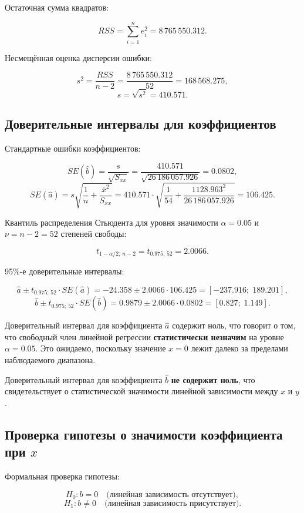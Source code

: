 Остаточная сумма квадратов:

\[
RSS = \sum_{i=1}^{n} e_i^2 = 8\,765\,550.312.
\]

Несмещённая оценка дисперсии ошибки:

\[
s^2 = \frac{RSS}{n-2} = \frac{8\,765\,550.312}{52} = 168\,568.275,
\]
\[
s = \sqrt{s^2} = 410.571.
\]

\subsection{Доверительные интервалы для коэффициентов}

Стандартные ошибки коэффициентов:

\[
SE(\hat{b}) = \frac{s}{\sqrt{S_{xx}}} = \frac{410.571}{\sqrt{26\,186\,057.926}} = 0.0802,
\]
\[
SE(\hat{a}) = s\sqrt{\frac{1}{n} + \frac{\bar{x}^2}{S_{xx}}}
= 410.571 \cdot \sqrt{\frac{1}{54} + \frac{1128.963^2}{26\,186\,057.926}} = 106.425.
\]

Квантиль распределения Стьюдента для уровня значимости \(\alpha = 0.05\) и \(\nu = n - 2 = 52\) степеней свободы:

\[
t_{1-\alpha/2;\, n-2} = t_{0.975;\,52} = 2.0066.
\]

95\%-е доверительные интервалы:

\[
\hat{a} \pm t_{0.975;\,52} \cdot SE(\hat{a}) = -24.358 \pm 2.0066 \cdot 106.425 = [-237.916;\; 189.201],
\]
\[
\hat{b} \pm t_{0.975;\,52} \cdot SE(\hat{b}) = 0.9879 \pm 2.0066 \cdot 0.0802 = [0.827;\; 1.149].
\]

Доверительный интервал для коэффициента \(\hat{a}\) содержит ноль, что говорит о том, что свободный член линейной регрессии \textbf{статистически незначим} на уровне \(\alpha = 0.05\). Это ожидаемо, поскольку значение \(x = 0\) лежит далеко за пределами наблюдаемого диапазона.

Доверительный интервал для коэффициента \(\hat{b}\) \textbf{не содержит ноль}, что свидетельствует о статистической значимости линейной зависимости между \(x\) и \(y\).

\subsection{Проверка гипотезы о значимости коэффициента при \(x\)}

Формальная проверка гипотезы:

\[
H_0: b = 0 \quad \text{(линейная зависимость отсутствует)},
\]
\[
H_1: b \neq 0 \quad \text{(линейная зависимость присутствует)}.
\]

